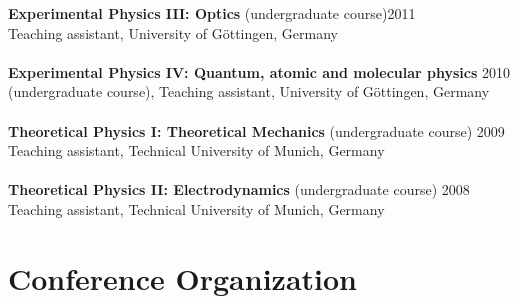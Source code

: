 \documentclass[margin,line]{res}
\begin{document}
\begin{resume}
{\bf Experimental Physics III: Optics}  (undergraduate course)\hfill {2011}\\
Teaching assistant, University of Göttingen, Germany \\
\vspace*{-3mm}\\
{\bf Experimental Physics IV: Quantum, atomic and molecular physics}  \hfill {2010}\\
(undergraduate course), Teaching assistant, University of Göttingen, Germany\\
\vspace*{-3mm}\\
{\bf Theoretical Physics I: Theoretical Mechanics} (undergraduate course) \hfill {2009}\\
Teaching assistant, Technical University of Munich, Germany\\
\vspace*{-3mm}\\
{\bf Theoretical Physics II: Electrodynamics} (undergraduate course) \hfill {2008}\\
Teaching assistant, Technical University of Munich, Germany\\


\section{\sc Conference Organization}


\end{resume}
\end{document}
